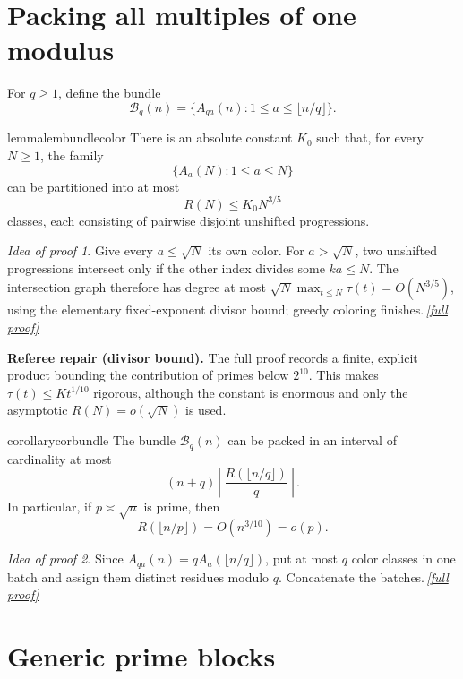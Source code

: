 \documentclass[11pt,a4paper]{article}
\theoremstyle{plain}
\theoremstyle{definition}
\theoremstyle{remark}
\newtheorem*{proofidea}{Idea of proof}
\newcommand{\fullproofref}[1]{\,\hyperref[#1]{\textit{[full proof]}}}
\newcommand{\cB}{\mathcal B}
\begin{document}
\section{Packing all multiples of one modulus}\label{sec:bundles}

For $q\ge1$, define the bundle
\[
 \cB_q(n)=\{A_{qa}(n):1\le a\le\lfloor n/q\rfloor\}.
\]

\begin{restatable}{lemma}{lembundlecolor}\label{lem:bundlecolor}
There is an absolute constant $K_0$ such that, for every $N\ge1$, the family
\[
 \{A_a(N):1\le a\le N\}
\]
can be partitioned into at most
\[
 R(N)\le K_0N^{3/5}
\tag{3.1}
\]
classes, each consisting of pairwise disjoint unshifted progressions.
\end{restatable}
\begin{proofidea}
Give every $a\le\sqrt N$ its own color. For $a>\sqrt N$, two unshifted progressions intersect only if the other index divides some $ka\le N$. The intersection graph therefore has degree at most $\sqrt N\max_{t\le N}\tau(t)=O(N^{3/5})$, using the elementary fixed-exponent divisor bound; greedy coloring finishes.\fullproofref{pf:bundlecolor}
\end{proofidea}

\begin{repairbox}
\textbf{Referee repair (divisor bound).} The full proof records a finite, explicit product bounding the contribution of primes below $2^{10}$. This makes $\tau(t)\le Kt^{1/10}$ rigorous, although the constant is enormous and only the asymptotic $R(N)=o(\sqrt N)$ is used.
\end{repairbox}

\begin{restatable}{corollary}{corbundle}\label{cor:bundle}
The bundle $\cB_q(n)$ can be packed in an interval of cardinality at most
\[
 (n+q)\left\lceil\frac{R(\lfloor n/q\rfloor)}q\right\rceil.
\tag{3.2}\label{eq:bundle-packing}
\]
In particular, if $p\asymp\sqrt n$ is prime, then
\[
 R(\lfloor n/p\rfloor)=O(n^{3/10})=o(p).
\tag{3.3}\label{eq:bundle-colors-small}
\]
\end{restatable}
\begin{proofidea}
Since $A_{qa}(n)=qA_a(\lfloor n/q\rfloor)$, put at most $q$ color classes in one batch and assign them distinct residues modulo $q$. Concatenate the batches.\fullproofref{pf:bundle}
\end{proofidea}

\section{Generic prime blocks}\label{sec:blocks}
\end{document}
